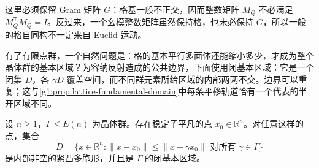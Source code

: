 这里必须保留 Gram 矩阵 \(G\)：格基一般不正交，因而整数矩阵 \(M_Q\) 不必满足 \(M_Q^{\mathsf T}M_Q=I\)。反过来，一个幺模整数矩阵虽然保持格，也未必保持 \(G\)，所以一般的格自同构不一定来自 Euclid 运动。

\ProseParagraphBreak

有了有限点群，一个自然问题是：格的基本平行多面体还能缩小多少，才成为整个晶体群的基本区域？为容纳反射造成的公共边界，下面使用闭基本区域：它是一个闭集 \(D\)，各 \(\gamma D\) 覆盖空间，而不同群元素所给区域的内部两两不交。边界可以重复；这与\cref{g1:prop:lattice-fundamental-domain}中每条平移轨道恰有一个代表的半开区域不同。

\begin{proposition}
	\label{g1:prop:crystallographic-dirichlet-cell}
	设 \(n\ge1\)，\(\Gamma\le E(n)\) 为晶体群。存在稳定子平凡的点 \(x_0\in\mathbb R^n\)。对任意这样的点，集合
	\begin{equation}\label{g1:eq:crystallographic-dirichlet-cell}
		D=\{x\in\mathbb R^n:\lVert x-x_0\rVert\le\lVert x-\gamma x_0\rVert
		\text{ 对所有 }\gamma\in\Gamma\}
	\end{equation}
	是内部非空的紧凸多胞形，并且是 \(\Gamma\) 的闭基本区域。
\end{proposition}
